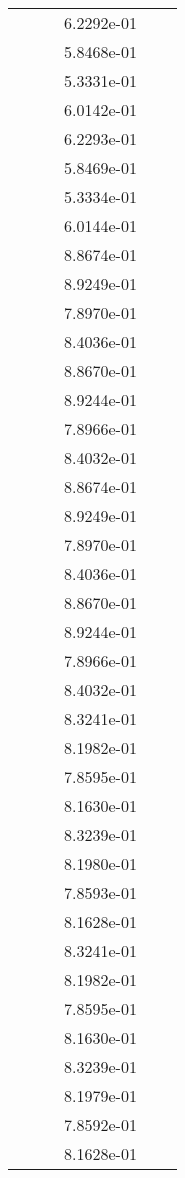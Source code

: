 \begin{xltabular}{\textwidth}{r|rS[table-format=1.3e+2]S[table-format=1.4e+2]S[table-format=1.4e+2]S[table-format=-1.5]}
&  &  & 6.2292e-01 & & \\
&  &  & 5.8468e-01 & & \\
&  &  & 5.3331e-01 & & \\
&  &  & 6.0142e-01 & & \\
&  &  & 6.2293e-01 & & \\
&  &  & 5.8469e-01 & & \\
&  &  & 5.3334e-01 & & \\
&  &  & 6.0144e-01 & & \\
&  &  & 8.8674e-01 & & \\
&  &  & 8.9249e-01 & & \\
&  &  & 7.8970e-01 & & \\
&  &  & 8.4036e-01 & & \\
&  &  & 8.8670e-01 & & \\
&  &  & 8.9244e-01 & & \\
&  &  & 7.8966e-01 & & \\
&  &  & 8.4032e-01 & & \\
&  &  & 8.8674e-01 & & \\
&  &  & 8.9249e-01 & & \\
&  &  & 7.8970e-01 & & \\
&  &  & 8.4036e-01 & & \\
&  &  & 8.8670e-01 & & \\
&  &  & 8.9244e-01 & & \\
&  &  & 7.8966e-01 & & \\
&  &  & 8.4032e-01 & & \\
&  &  & 8.3241e-01 & & \\
&  &  & 8.1982e-01 & & \\
&  &  & 7.8595e-01 & & \\
&  &  & 8.1630e-01 & & \\
&  &  & 8.3239e-01 & & \\
&  &  & 8.1980e-01 & & \\
&  &  & 7.8593e-01 & & \\
&  &  & 8.1628e-01 & & \\
&  &  & 8.3241e-01 & & \\
&  &  & 8.1982e-01 & & \\
&  &  & 7.8595e-01 & & \\
&  &  & 8.1630e-01 & & \\
&  &  & 8.3239e-01 & & \\
&  &  & 8.1979e-01 & & \\
&  &  & 7.8592e-01 & & \\
&  &  & 8.1628e-01 & & \\

\end{xltabular}
